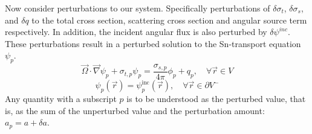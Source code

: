 \documentclass[12pt]{report}
\newcommand{\vr}{\vec{r}}
\newcommand{\vO}{\vec{\Omega}}
\newcommand{\grad}{\vec{\nabla}}
\newcommand{\sigt}{\sigma_t}
\newcommand{\sigs}{\sigma_s}
\begin{document}
Now consider perturbations to our system. Specifically perturbations of $\delta \sigt$, $\delta \sigs$, and $\delta q$ to the total cross section, scattering cross section and angular source term respectively. In addition, the incident angular flux is also perturbed by $\delta \psi^{inc}$. These perturbations result in a perturbed solution to the Sn-transport equation $\psi_p$. 
\begin{equation}
\label{snFwdPert}
\vO \cdot \grad \psi_p + \sigma_{t,p} \psi_p = \frac{\sigma_{s,p}}{4 \pi} \phi_p + q_p,  \quad \forall \vr \in V
\end{equation}
\begin{equation}
\psi_p(\vr) = \psi_p^{\text{inc}}(\vr), \quad \forall \vr \in \partial V^{-}
\end{equation}
Any quantity with a subscript $p$ is to be understood as the perturbed value, that is, as 
the sum of the unperturbed value and the perturbation amount: $a_p = a + \delta a$.
\end{document}
